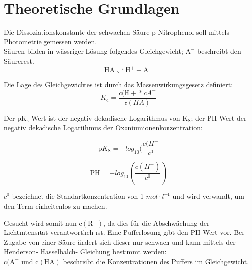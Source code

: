 \documentclass[12pt,a4paper,titlepage,headinclude,bibtotoc]{scrartcl}
\begin{document}
\tableofcontents

\newpage

\section{Theoretische Grundlagen}

Die Dissoziationskonstante der schwachen Säure p-Nitrophenol soll mittels Photometrie gemessen werden. \\
Säuren bilden in wässriger Lösung folgendes Gleichgewicht; $\mathrm{A^-}$ beschreibt den Säurerest.\\

\begin{equation}
\mathrm{HA}  \rightleftharpoons \mathrm{H^+} + \mathrm{A^-}
\end{equation}

Die Lage des Gleichgewichtes ist durch das Massenwirkungsgesetz definiert:\\

\begin{equation}
K_\mathrm{c} =\frac{c(\mathrm{H+}*c{A^-}}{c(HA)}
\end{equation}

Der $\mathrm{pK_s}$-Wert ist der negativ dekadische Logarithmus von $\mathrm{K_S}$; der PH-Wert der negativ dekadische Logarithmus der Oxoniumionenkonzentration:

\begin{equation}
\mathrm{p}K_\mathrm{S} = - log_{10} (\frac{c(H^+}{c^0}
\end{equation}

\begin{equation}
\mathrm{PH}= -log_{10}(\frac{c(H^+)}{c^0})
\end{equation}

$c^0$ bezeichnet die Standartkonzentration von 1 $mol\cdot l^{-1}$ und wird verwandt, um den Term einheitenlos zu machen.


Gesucht wird somit nun $\mathrm{c(R^-)}$, da dies für die Abschwächung der Lichtintensität verantwortlich ist. Eine Pufferlösung gibt den PH-Wert vor. Bei Zugabe von einer Säure ändert sich dieser nur schwach und kann mittels der Henderson- Hasselbalch- Gleichung bestimmt werden: \\


$\mathrm{c(A^-}$ und $\mathrm{c(HA)}$ beschreibt die Konzentrationen des Puffers im Gleichgewicht. \\
\end{document}
